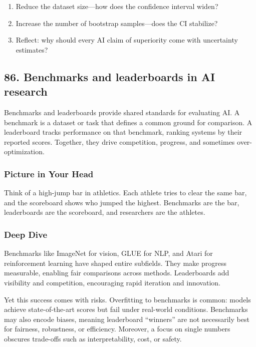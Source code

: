 \documentclass[
  letterpaper,
  DIV=11,
  numbers=noendperiod]{scrreprt}
\providecommand{\tightlist}{%
  \setlength{\itemsep}{0pt}\setlength{\parskip}{0pt}}
\begin{document}
\begin{enumerate}
\def\labelenumi{\arabic{enumi}.}
\tightlist
\item
  Reduce the dataset size---how does the confidence interval widen?
\item
  Increase the number of bootstrap samples---does the CI stabilize?
\item
  Reflect: why should every AI claim of superiority come with
  uncertainty estimates?
\end{enumerate}

\subsection{86. Benchmarks and leaderboards in AI
research}\label{benchmarks-and-leaderboards-in-ai-research}

Benchmarks and leaderboards provide shared standards for evaluating AI.
A benchmark is a dataset or task that defines a common ground for
comparison. A leaderboard tracks performance on that benchmark, ranking
systems by their reported scores. Together, they drive competition,
progress, and sometimes over-optimization.

\subsubsection{Picture in Your Head}\label{picture-in-your-head-85}

Think of a high-jump bar in athletics. Each athlete tries to clear the
same bar, and the scoreboard shows who jumped the highest. Benchmarks
are the bar, leaderboards are the scoreboard, and researchers are the
athletes.

\subsubsection{Deep Dive}\label{deep-dive-85}

Benchmarks like ImageNet for vision, GLUE for NLP, and Atari for
reinforcement learning have shaped entire subfields. They make progress
measurable, enabling fair comparisons across methods. Leaderboards add
visibility and competition, encouraging rapid iteration and innovation.

Yet this success comes with risks. Overfitting to benchmarks is common:
models achieve state-of-the-art scores but fail under real-world
conditions. Benchmarks may also encode biases, meaning leaderboard
``winners'' are not necessarily best for fairness, robustness, or
efficiency. Moreover, a focus on single numbers obscures trade-offs such
as interpretability, cost, or safety.
\end{document}
